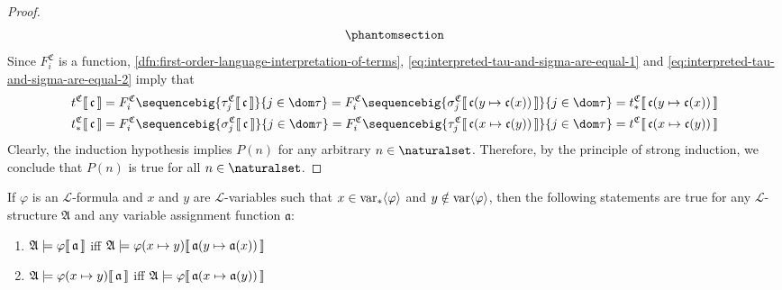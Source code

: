 \begin{proof}
\begin{gather}
        \phantomsection \label{eq:interpreted-tau-and-sigma-are-equal-2}
    \end{gather}
    Since \( F^{\mathfrak{C}}_{i} \) is a function, \cref{dfn:first-order-language-interpretation-of-terms}, \eqref{eq:interpreted-tau-and-sigma-are-equal-1}
    and \eqref{eq:interpreted-tau-and-sigma-are-equal-2} imply that
    \begin{gather*}
        \folterminterpretation{t}{\mathfrak{C}}{\mathfrak{c}} =
        F^{\mathfrak{C}}_{i} \sequencebig{ \folterminterpretation{\tau_{j}}{\mathfrak{C}}{\mathfrak{c}} }{ j \in \dom \tau } =
        F^{\mathfrak{C}}_{i} \sequencebig{ \folterminterpretation{\sigma_{j}}{\mathfrak{C}}{ \folmodifiedvariableassignmentfunction{\mathfrak{c}}{y}{\mathfrak{c}(x)} } }{ j \in \dom \tau } =
        \folterminterpretation{t_{\ast}}{\mathfrak{C}}{ \folmodifiedvariableassignmentfunction{\mathfrak{c}}{y}{ \mathfrak{c}(x) } }\\
        \folterminterpretation{t_{\ast}}{\mathfrak{C}}{\mathfrak{c}} =
        F^{\mathfrak{C}}_{i} \sequencebig{ \folterminterpretation{\sigma_{j}}{\mathfrak{C}}{\mathfrak{c}} }{ j \in \dom \tau } =
        F^{\mathfrak{C}}_{i} \sequencebig{ \folterminterpretation{\tau_{j}}{\mathfrak{C}}{ \folmodifiedvariableassignmentfunction{\mathfrak{c}}{x}{\mathfrak{c}(y)} } }{ j \in \dom \tau } =
        \folterminterpretation{t}{\mathfrak{C}}{ \folmodifiedvariableassignmentfunction{\mathfrak{c}}{x}{ \mathfrak{c}(y) } }
    \end{gather*}
    Clearly, the induction hypothesis implies \( P(n) \) for any arbitrary \( n \in \naturalset \).
    Therefore, by the principle of strong induction, we conclude that \( P(n) \) is true for all \( n \in \naturalset \).
\end{proof}

\begin{thm}
     \label{thm:satisfaction-of-formulas-with-replaced-free-variables}
    If \( \varphi \) is an \( \mathcal{L} \)-formula and \( x \) and \( y \) are \( \mathcal{L} \)-variables such that
    \( x \in \operatorname{var}_{\ast} \langle\varphi\rangle \) and \( y \notin \operatorname{var} \langle\varphi\rangle \), then the following statements are true
    for any \( \mathcal{L} \)-structure \( \mathfrak{A} \) and any variable assignment function \( \mathfrak{a} \):
    \begin{enumerate}[topsep=2pt,label=\textup{\texttt{(\alph*)}}]
        \item \(  \mathfrak{A} \models \varphi\llbracket\, \mathfrak{a} \,\rrbracket \)
            iff \( \folwffsatisfaction{\mathfrak{A}}{ \folfreevariablereplacement{\varphi}{x}{y} }{ \folmodifiedvariableassignmentfunction{\mathfrak{a}}{y}{ \mathfrak{a}(x) } }\)
        \item \( \folwffsatisfaction{\mathfrak{A}}{ \folfreevariablereplacement{\varphi}{x}{y} }{\mathfrak{a}} \)
            iff \( \folwffsatisfaction{\mathfrak{A}}{\varphi}{ \folmodifiedvariableassignmentfunction{\mathfrak{a}}{x}{ \mathfrak{a}(y)} } \)
    \end{enumerate}
\end{thm}

